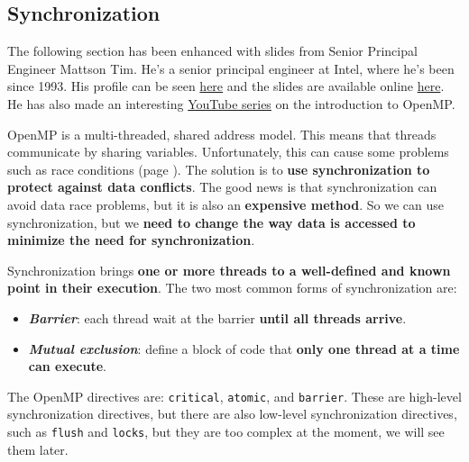 \subsection{Synchronization}

The following section has been enhanced with slides from Senior Principal Engineer Mattson Tim. He's a senior principal engineer at Intel, where he's been since 1993. His profile can be seen \href{https://www.intel.com/content/www/us/en/research/featured-researchers/tim-mattson.html}{here} and the slides are available online \href{https://www.openmp.org/wp-content/uploads/Intro_To_OpenMP_Mattson.pdf}{here}. He has also made an interesting \href{https://youtube.com/playlist?list=PLLX-Q6B8xqZ8n8bwjGdzBJ25X2utwnoEG&si=OBjyY4AI4zWfA-vB}{YouTube series} on the introduction to OpenMP.

\highspace
OpenMP is a multi-threaded, shared address model. This means that threads communicate by sharing variables. Unfortunately, this can cause some problems such as race conditions (page \pageref{def: race condition}). The solution is to \textbf{use synchronization to protect against data conflicts}. The good news is that synchronization can avoid data race problems, but it is also an \textbf{expensive method}. So we can use synchronization, but we \textbf{need to change the way data is accessed to minimize the need for synchronization}.

\highspace
Synchronization brings \textbf{one or more threads to a well-defined and known point in their execution}. The two most common forms of synchronization are:
\begin{itemize}
    \item \textbf{\emph{Barrier}}: each thread wait at the barrier \textbf{until all threads arrive}.
    \item \textbf{\emph{Mutual exclusion}}: define a block of code that \textbf{only one thread at a time can execute}.
\end{itemize}
The OpenMP directives are: \texttt{critical}, \texttt{atomic}, and \texttt{barrier}. These are high-level synchronization directives, but there are also low-level synchronization directives, such as \texttt{flush} and \texttt{locks}, but they are too complex at the moment, we will see them later.


